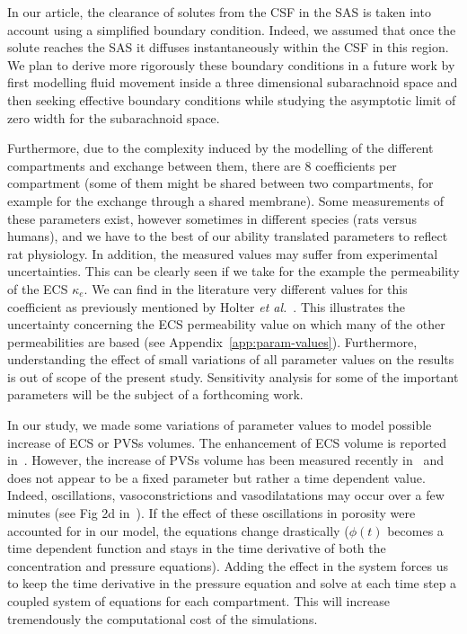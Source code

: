 \documentclass[10pt]{article}
\newcommand{\etal}{\emph{et al.}\;}
\newcommand{\1}{^{(1)}}
\newcommand{\2}{^{(2)}}
\begin{document}
In our article, the clearance of solutes from the CSF in the SAS is taken into account using a simplified boundary condition. 
Indeed, we assumed that once the solute reaches the SAS it diffuses instantaneously within the CSF in this region.
We plan to derive more rigorously these boundary conditions in a future work by first modelling fluid movement inside a three dimensional subarachnoid space and then seeking effective boundary conditions while studying the asymptotic limit of zero width for the subarachnoid space. 


Furthermore, due to the complexity induced by the modelling of the different compartments and exchange between them, there are $8$ coefficients per compartment (some of them might be shared between two compartments, for example for the exchange through a shared membrane). Some measurements of these parameters  exist, however sometimes in different species (rats versus humans), and we have to the best of our ability translated parameters to reflect rat physiology. In addition, the measured values may suffer from experimental uncertainties. This can be clearly seen if we take for the example the permeability of the ECS $\kappa_e$. We can find in the literature very different values for this coefficient as previously mentioned by Holter \etal~\cite{Holter9894}.
This illustrates the uncertainty concerning the ECS permeability value on which many of the other permeabilities are based (see Appendix~\ref{app:param-values}). Furthermore, understanding the effect of small variations of all parameter values on the results is out of scope of the present study. Sensitivity analysis for some of the important parameters will be the subject of a forthcoming work.    


In our study, we made some variations of parameter values to model possible increase of ECS or PVSs volumes. The enhancement of ECS volume is reported in~\cite{Xie_2013_sleep}. However, the increase of PVSs volume has been measured recently in~\cite{Bojarskaite2022} and does not appear to be a fixed parameter but rather a time dependent value. Indeed, oscillations, vasoconstrictions and vasodilatations may occur over a few minutes (see Fig 2d in~\cite{Bojarskaite2022}). If the effect of these oscillations in porosity were accounted for in our model, the equations change drastically ($\phi(t)$ becomes a time dependent function and stays in the time derivative of both the concentration and pressure equations). Adding the effect in the system forces us to keep the time derivative in the pressure equation and solve at each time step a coupled system of equations for each compartment. This will increase tremendously the computational cost of the simulations. 
\end{document}
